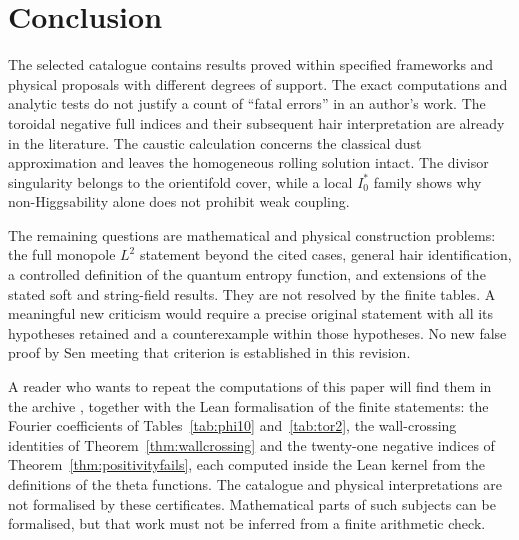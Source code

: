 \section{Conclusion}\label{sec:conclusion}

The selected catalogue contains results proved within specified frameworks and physical proposals with different degrees of support. The exact computations and analytic tests do not justify a count of ``fatal errors'' in an author's work. The toroidal negative full indices and their subsequent hair interpretation are already in the literature. The caustic calculation concerns the classical dust approximation and leaves the homogeneous rolling solution intact. The divisor singularity belongs to the orientifold cover, while a local $I_0^*$ family shows why non-Higgsability alone does not prohibit weak coupling.

The remaining questions are mathematical and physical construction problems: the full monopole $L^2$ statement beyond the cited cases, general hair identification, a controlled definition of the quantum entropy function, and extensions of the stated soft and string-field results. They are not resolved by the finite tables. A meaningful new criticism would require a precise original statement with all its hypotheses retained and a counterexample within those hypotheses. No new false proof by Sen meeting that criterion is established in this revision.

A reader who wants to repeat the computations of this paper will find them in the archive \cite{Bha26}, together with the Lean formalisation of the finite statements: the Fourier coefficients of Tables~\ref{tab:phi10} and~\ref{tab:tor2}, the wall-crossing identities of Theorem~\ref{thm:wallcrossing} and the twenty-one negative indices of Theorem~\ref{thm:positivityfails}, each computed inside the Lean kernel from the definitions of the theta functions. The catalogue and physical interpretations are not formalised by these certificates. Mathematical parts of such subjects can be formalised, but that work must not be inferred from a finite arithmetic check.
